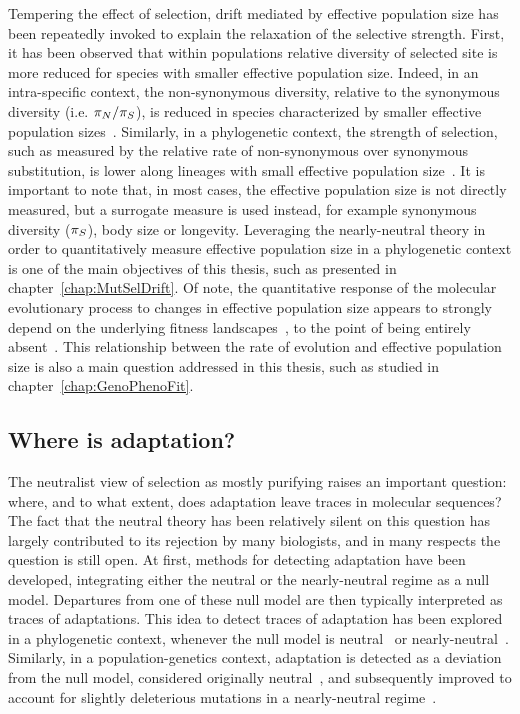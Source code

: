 Tempering the effect of selection, drift mediated by effective population size has been repeatedly invoked to explain the relaxation of the selective strength.
First, it has been observed that within populations relative diversity of selected site is more reduced for species with smaller effective population size.
Indeed, in an intra-specific context, the non-synonymous diversity, relative to the synonymous diversity (i.e. $\pi_N / \pi_S$), is reduced in species characterized by smaller effective population sizes~\citep{Piganeau2009, Elyashiv2010, Galtier2016, Chen2017, James2017}.
Similarly, in a phylogenetic context, the strength of selection, such as measured by the relative rate of non-synonymous over synonymous substitution, is lower along lineages with small effective population size~\citep{Ohta1993, Ohta1995, Moran1996, Woolfit2003, Woolfit2005, Popadin2007}.
It is important to note that, in most cases, the effective population size is not directly measured, but a surrogate measure is used instead, for example synonymous diversity ($\pi_S$), body size or longevity.
Leveraging the nearly-neutral theory in order to quantitatively measure effective population size in a phylogenetic context is one of the main objectives of this thesis, such as presented in chapter~\ref{chap:MutSelDrift}.
Of note, the quantitative response of the molecular evolutionary process to changes in effective population size appears to strongly depend on the underlying fitness landscapes~\citep{Welch2008}, to the point of being entirely absent~\citep{Cherry1998, Goldstein2013}.
This relationship between the rate of evolution and effective population size is also a main question addressed in this thesis, such as studied in chapter~\ref{chap:GenoPhenoFit}.

\subsection{Where is adaptation?}
\label{subsec:where-is-adaptation?}

The neutralist view of selection as mostly purifying raises an important question: where, and to what extent, does adaptation leave traces in molecular sequences?
The fact that the neutral theory has been relatively silent on this question has largely contributed to its rejection by many biologists, and in many respects the question is still open.
At first, methods for detecting adaptation have been developed, integrating either the neutral or the nearly-neutral regime as a null model.
Departures from one of these null model are then typically interpreted as traces of adaptations.
This idea to detect traces of adaptation has been explored in a phylogenetic context, whenever the null model is neutral~\citep{Goldman1994, Muse1994, Yang2002, Zhang2004} or nearly-neutral~\citep{Rodrigue2016, Bloom2017}.
Similarly, in a population-genetics context, adaptation is detected as a deviation from the null model, considered originally neutral~\citep{McDonald1991, Charlesworth1994, Smith2002}, and subsequently improved to account for slightly deleterious mutations in a nearly-neutral regime~\citep{eyre-walker_estimating_2009, Galtier2016}.

